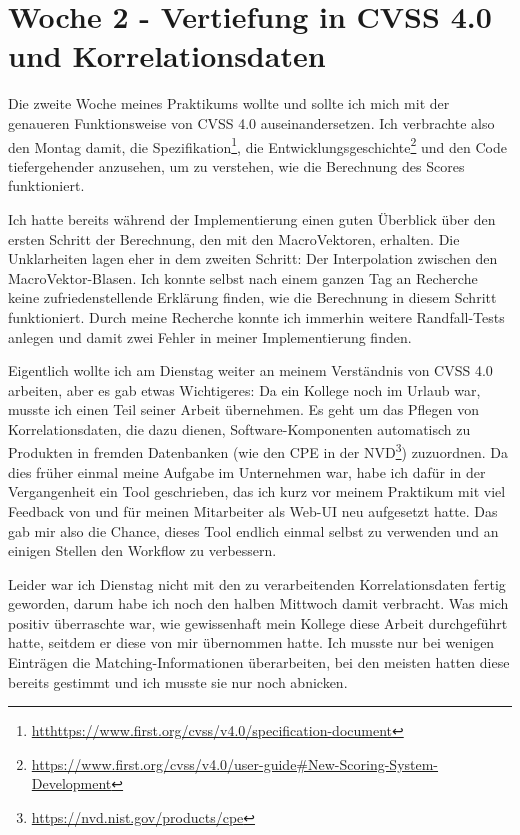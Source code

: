 \section{Woche 2 - Vertiefung in CVSS 4.0 und Korrelationsdaten} \label{sec:bericht-wo-2}

Die zweite Woche meines Praktikums wollte und sollte ich mich mit der genaueren Funktionsweise von CVSS 4.0 auseinandersetzen.
Ich verbrachte also den Montag damit, die Spezifikation\footnote{\url{htthttps://www.first.org/cvss/v4.0/specification-document}},
die Entwicklungsgeschichte\footnote{\url{https://www.first.org/cvss/v4.0/user-guide#New-Scoring-System-Development}}
und den Code tiefergehender anzusehen, um zu verstehen, wie die Berechnung des Scores funktioniert.

Ich hatte bereits während der Implementierung einen guten Überblick über den ersten Schritt der Berechnung, den mit den MacroVektoren, erhalten.
Die Unklarheiten lagen eher in dem zweiten Schritt: Der Interpolation zwischen den MacroVektor-Blasen.
Ich konnte selbst nach einem ganzen Tag an Recherche keine zufriedenstellende Erklärung finden, wie die Berechnung in diesem Schritt funktioniert.
Durch meine Recherche konnte ich immerhin weitere Randfall-Tests anlegen und damit zwei Fehler in meiner Implementierung finden.

Eigentlich wollte ich am Dienstag weiter an meinem Verständnis von CVSS 4.0 arbeiten, aber es gab etwas Wichtigeres:
Da ein Kollege noch im Urlaub war, musste ich einen Teil seiner Arbeit übernehmen.
Es geht um das Pflegen von Korrelationsdaten, die dazu dienen, Software-Komponenten automatisch zu Produkten in fremden Datenbanken (wie den CPE in der NVD\footnote{\url{https://nvd.nist.gov/products/cpe}}) zuzuordnen.
Da dies früher einmal meine Aufgabe im Unternehmen war, habe ich dafür in der Vergangenheit ein Tool geschrieben, das ich kurz vor meinem Praktikum mit viel Feedback von und für meinen Mitarbeiter als Web-UI neu aufgesetzt hatte.
Das gab mir also die Chance, dieses Tool endlich einmal selbst zu verwenden und an einigen Stellen den Workflow zu verbessern.

Leider war ich Dienstag nicht mit den zu verarbeitenden Korrelationsdaten fertig geworden, darum habe ich noch den halben Mittwoch damit verbracht.
Was mich positiv überraschte war, wie gewissenhaft mein Kollege diese Arbeit durchgeführt hatte, seitdem er diese von mir übernommen hatte.
Ich musste nur bei wenigen Einträgen die Matching-Informationen überarbeiten, bei den meisten hatten diese bereits gestimmt und ich musste sie nur noch abnicken.

